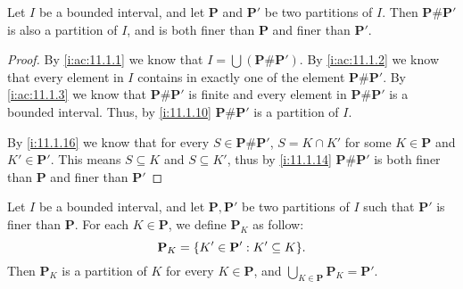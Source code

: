 \setcounter{thm}{17}
\begin{lem}\label{i:11.1.18}
  Let \(I\) be a bounded interval, and let \(\mathbf{P}\) and \(\mathbf{P}'\) be two partitions of \(I\).
  Then \(\mathbf{P} \# \mathbf{P}'\) is also a partition of \(I\), and is both finer than \(\mathbf{P}\) and finer than \(\mathbf{P}'\).
\end{lem}

\begin{proof}
  By \cref{i:ac:11.1.1} we know that \(I = \bigcup (\mathbf{P} \# \mathbf{P}')\).
  By \cref{i:ac:11.1.2} we know that every element in \(I\) contains in exactly one of the element \(\mathbf{P} \# \mathbf{P}'\).
  By \cref{i:ac:11.1.3} we know that \(\mathbf{P} \# \mathbf{P}'\) is finite and every element in  \(\mathbf{P} \# \mathbf{P}'\) is a bounded interval.
  Thus, by \cref{i:11.1.10} \(\mathbf{P} \# \mathbf{P}'\) is a partition of \(I\).

  By \cref{i:11.1.16} we know that for every \(S \in \mathbf{P} \# \mathbf{P}'\), \(S = K \cap K'\) for some \(K \in \mathbf{P}\) and \(K' \in \mathbf{P}'\).
  This means \(S \subseteq K\) and \(S \subseteq K'\), thus by \cref{i:11.1.14} \(\mathbf{P} \# \mathbf{P}'\) is both finer than \(\mathbf{P}\) and finer than \(\mathbf{P}'\)
\end{proof}

\begin{ac}\label{i:ac:11.1.4}
  Let \(I\) be a bounded interval, and let \(\mathbf{P}, \mathbf{P}'\) be two partitions of \(I\) such that \(\mathbf{P}'\) is finer than \(\mathbf{P}\).
  For each \(K \in \mathbf{P}\), we define \(\mathbf{P}_K\) as follow:
  \[
    \mathbf{P}_K = \set{K' \in \mathbf{P}' : K' \subseteq K}.
  \]
  Then \(\mathbf{P}_K\) is a partition of \(K\) for every \(K \in \mathbf{P}\), and \(\bigcup_{K \in \mathbf{P}} \mathbf{P}_K = \mathbf{P}'\).
\end{ac}

